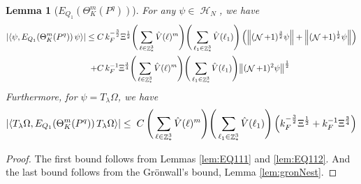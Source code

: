 \documentclass[sn-mathphys, Numbered ,a4paper]{sn-jnl}%
\DeclareMathOperator{\Z}{\mathbb{Z}}
\DeclareMathOperator{\HH}{\mathcal{H}}
\DeclareMathOperator{\NN}{\mathcal{N}}
\newcommand{\half}{\frac{1}{2}}
\newcommand{\eva}[1]{\left\langle #1 \right\rangle}
\theoremstyle{plain}
\newtheorem{lemma}[theorem]{Lemma}
\theoremstyle{definition}
\theoremstyle{remark}
\theoremstyle{plain}
\theoremstyle{definition}
\theoremstyle{remark}
\begin{document}
\begin{lemma}[$E_{Q_1}(\Theta^m_{K}(P^q))$]
	For any $\psi \in \HH_N$, we have
	\begin{align}
		\abs{\eva{\psi, E_{Q_1}\!\left(\Theta^m_K(P^q)\right)  \psi}} \leq \; &C\,  k_{F}^{-\frac{3}{2}} \Xi^\half \Bigg(\sum\limits_{\ell \in \Z^3_*} \hat{V}(\ell)^m\Bigg)\Bigg( \sum\limits_{\ell_1 \in \Z^3_*} \hat{V}(\ell_1) \Bigg) \left(\norm { (\NN+1)^{\frac{3}{2}} \psi } + \norm { (\NN+1)^{\frac{1}{2}} \psi } \right)\nonumber\\
		\;+ &C\, k_{F}^{-1}\Xi^{\frac{3}{4}} \Bigg(\sum\limits_{\ell \in \Z^3_*} \hat{V}(\ell)^m\Bigg) \Bigg(\sum\limits_{\ell_1 \in \Z^3_*} \hat{V}(\ell_1) \Bigg)  \norm{ (\NN+1)^2\psi}^\half \label{eq:genEQ1est}
	\end{align}
Furthermore, for $\psi = T_{\lambda}\Omega$, we have 
\begin{equation}
	\abs{\eva{ T_{\lambda}\Omega, E_{Q_1}\!\left(\Theta^m_K(P^q) \right)  T_{\lambda}\Omega}} \leq \; C\,  \Bigg(\sum\limits_{\ell \in \Z^3_*} \hat{V}(\ell)^m\Bigg)\Bigg( \sum\limits_{\ell_1 \in \Z^3_*} \hat{V}(\ell_1) \Bigg)\left( k_{F}^{-\frac{3}{2}} \Xi^\half 
	+ k_{F}^{-1}\Xi^{\frac{3}{4}} \right) \label{eq:finalEQ1est}
\end{equation}
\end{lemma}
\begin{proof}
	The first bound follows from Lemmas \ref{lem:EQ111} and \ref{lem:EQ112}. And the last bound follows from the Gr\"onwall's bound, Lemma \ref{lem:gronNest}. 
\end{proof}
\end{document}
